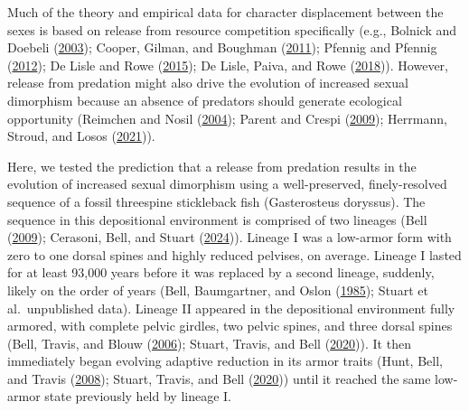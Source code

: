 \documentclass[
  12pt,
]{article}
\begin{document}
Much of the theory and empirical data for character displacement between
the sexes is based on release from resource competition specifically
(e.g., Bolnick and Doebeli
(\protect\hyperlink{ref-BolnickandDoebeli2003}{2003}); Cooper, Gilman,
and Boughman (\protect\hyperlink{ref-Cooperetal2011}{2011}); Pfennig and
Pfennig (\protect\hyperlink{ref-PfennigandPfennig2012}{2012}); De Lisle
and Rowe (\protect\hyperlink{ref-DeLisleandRowe2015}{2015}); De Lisle,
Paiva, and Rowe (\protect\hyperlink{ref-DeLisleetal2018}{2018})).
However, release from predation might also drive the evolution of
increased sexual dimorphism because an absence of predators should
generate ecological opportunity (Reimchen and Nosil
(\protect\hyperlink{ref-ReimchenandNosil2004}{2004}); Parent and Crespi
(\protect\hyperlink{ref-ParentandCrespi2009}{2009}); Herrmann, Stroud,
and Losos (\protect\hyperlink{ref-Herrmannetal2021}{2021})).

Here, we tested the prediction that a release from predation results in
the evolution of increased sexual dimorphism using a well-preserved,
finely-resolved sequence of a fossil threespine stickleback fish
(Gasterosteus doryssus). The sequence in this depositional environment
is comprised of two lineages (Bell
(\protect\hyperlink{ref-Bell2009}{2009}); Cerasoni, Bell, and Stuart
(\protect\hyperlink{ref-Cerasonietal2024}{2024})). Lineage I was a
low-armor form with zero to one dorsal spines and highly reduced
pelvises, on average. Lineage I lasted for at least 93,000 years before
it was replaced by a second lineage, suddenly, likely on the order of
years (Bell, Baumgartner, and Oslon
(\protect\hyperlink{ref-Belletal1985}{1985}); Stuart et al.~unpublished
data). Lineage II appeared in the depositional environment fully
armored, with complete pelvic girdles, two pelvic spines, and three
dorsal spines (Bell, Travis, and Blouw
(\protect\hyperlink{ref-Belletal2006}{2006}); Stuart, Travis, and Bell
(\protect\hyperlink{ref-Stuartetal2020}{2020})). It then immediately
began evolving adaptive reduction in its armor traits (Hunt, Bell, and
Travis (\protect\hyperlink{ref-Huntetal2008}{2008}); Stuart, Travis, and
Bell (\protect\hyperlink{ref-Stuartetal2020}{2020})) until it reached
the same low-armor state previously held by lineage I.
\end{document}
